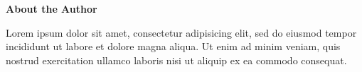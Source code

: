 
\clearpage
{}
{}
\begin{adjustwidth}{0.1\textwidth}{0.1\textwidth}
\begingroup
\null\vspace{0.2\textheight}
\begin{center}
{\bfseries\Large About the Author}\par\vspace{2em}

Lorem ipsum dolor sit amet, consectetur adipisicing elit, sed do eiusmod tempor incididunt ut labore et dolore magna aliqua. Ut enim ad minim veniam, quis nostrud exercitation ullamco laboris nisi ut aliquip ex ea commodo consequat.
\end{center}
\endgroup
\end{adjustwidth}
\clearpage